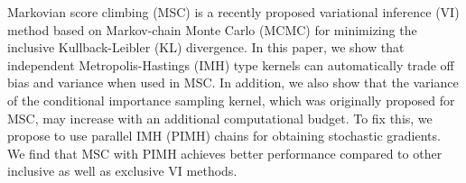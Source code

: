 
Markovian score climbing (MSC) is a recently proposed variational inference (VI) method based on Markov-chain Monte Carlo (MCMC) for minimizing the inclusive Kullback-Leibler (KL) divergence.
In this paper, we show that independent Metropolis-Hastings (IMH) type kernels can automatically trade off bias and variance when used in MSC.
In addition, we also show that the variance of the conditional importance sampling kernel, which was originally proposed for MSC, may increase with an additional computational budget.
To fix this, we propose to use parallel IMH (PIMH) chains for obtaining stochastic gradients.
We find that MSC with PIMH achieves better performance compared to other inclusive as well as exclusive VI methods.

